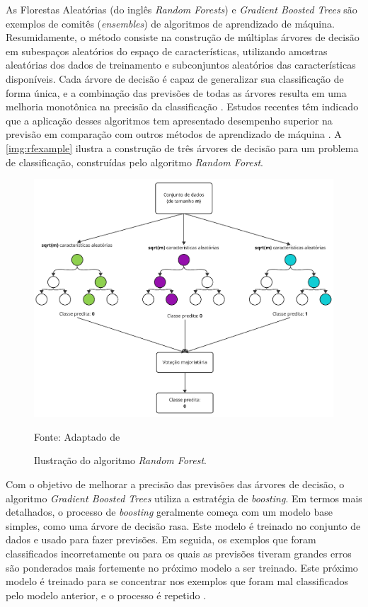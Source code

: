 As Florestas Aleatórias (do inglês \textit{Random Forests}) e \textit{Gradient Boosted Trees} são exemplos de comitês (\textit{ensembles}) de algoritmos de aprendizado de máquina. Resumidamente, o método consiste na construção de múltiplas árvores de decisão em subespaços aleatórios do espaço de características, utilizando amostras aleatórias dos dados de treinamento e subconjuntos aleatórios das características disponíveis. Cada árvore de decisão é capaz de generalizar sua classificação de forma única, e a combinação das previsões de todas as árvores resulta em uma melhoria monotônica na precisão da classificação \cite{RandomForests}. Estudos recentes têm indicado que a aplicação desses algoritmos tem apresentado desempenho superior na previsão em comparação com outros métodos de aprendizado de máquina \cite{geron2022hands, Raschka}. A \autoref{img:rfexample} ilustra a construção de três árvores de decisão para um problema de classificação, construídas pelo algoritmo \textit{Random Forest}.

\begin{figure}[H]
	\centering
	\caption{\label{img:rfexample}Ilustração do algoritmo \textit{Random Forest}.}
	\includegraphics[scale=0.7]{USPSC-img/random_forest_example.pdf}
	\begin{center}
		Fonte: Adaptado de 
	\end{center}
\end{figure}

Com o objetivo de melhorar a precisão das previsões das árvores de decisão, o algoritmo \textit{Gradient Boosted Trees} \cite{friedman2000} utiliza a estratégia de \textit{boosting}. Em termos mais detalhados, o processo de \textit{boosting} geralmente começa com um modelo base simples, como uma árvore de decisão rasa. Este modelo é treinado no conjunto de dados e usado para fazer previsões. Em seguida, os exemplos que foram classificados incorretamente ou para os quais as previsões tiveram grandes erros são ponderados mais fortemente no próximo modelo a ser treinado. Este próximo modelo é treinado para se concentrar nos exemplos que foram mal classificados pelo modelo anterior, e o processo é repetido \cite{friedman2000}.

